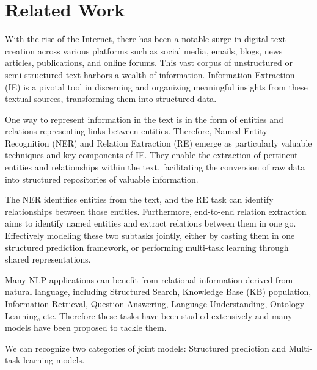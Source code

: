 \chapter{Related Work}
\label{chp:relatedWork}

With the rise of the Internet, there has been a notable surge in digital text creation across various platforms such as social media, emails, blogs, news articles, publications, and online forums. This vast corpus of unstructured or semi-structured text harbors a wealth of information. Information Extraction (IE) is a pivotal tool in discerning and organizing meaningful insights from these textual sources, transforming them into structured data.

One way to represent information in the text is in the form of entities and relations representing links between entities. Therefore, Named Entity Recognition (NER) and Relation Extraction (RE) emerge as particularly valuable techniques and key components of IE. They enable the extraction of pertinent entities and relationships within the text, facilitating the conversion of raw data into structured repositories of valuable information.

The NER identifies entities from the text, and the RE task can identify relationships between those entities. Furthermore, end-to-end relation extraction aims to identify named entities and extract relations between them in one go. Effectively modeling these two subtasks jointly\cite{Zhong2020AFE}, either by casting them in one structured prediction framework, or performing multi-task learning through shared representations.

Many NLP applications can benefit from relational information derived from natural language\cite{Goyal2018RNE}, including Structured Search, Knowledge Base (KB) population, Information Retrieval, Question-Answering, Language Understanding, Ontology Learning, etc. Therefore these tasks have been studied extensively and many models have been proposed to tackle them.

We can recognize two categories of joint models: Structured prediction and Multi-task learning models.

